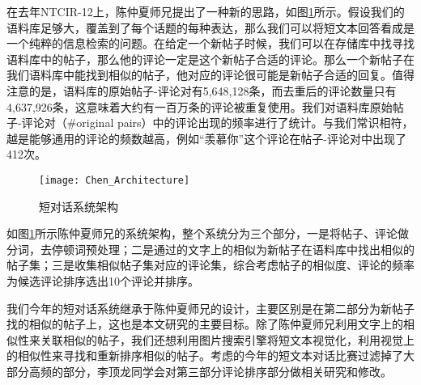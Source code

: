 在去年NTCIR-12上，陈仲夏师兄提出了一种新的思路，如图\ref{fig:Chen_Architecture}所示。假设我们的语料库足够大，覆盖到了每个话题的每种表达，那么我们可以将短文本回答看成是一个纯粹的信息检索的问题。在给定一个新帖子时候，我们可以在存储库中找寻找语料库中的帖子，那么他的评论一定是这个新帖子合适的评论。那么一个新帖子在我们语料库中能找到相似的帖子，他对应的评论很可能是新帖子合适的回复。值得注意的是，语料库的原始帖子-评论对有5,648,128条，而去重后的评论数量只有4,637,926条，这意味着大约有一百万条的评论被重复使用。我们对语料库原始帖子-评论对（\#original pairs）中的评论出现的频率进行了统计。与我们常识相符，越是能够通用的评论的频数越高，例如“羡慕你”这个评论在帖子-评论对中出现了412次。

\begin{figure}[ht]
\centering
\texttt{[image: Chen\_Architecture]}
\caption{短对话系统架构} \label{fig:Chen_Architecture}
\end{figure}

如图\ref{fig:Chen_Architecture}所示陈仲夏师兄的系统架构，整个系统分为三个部分，一是将帖子、评论做分词，去停顿词预处理；二是通过的文字上的相似为新帖子在语料库中找出相似的帖子集；三是收集相似帖子集对应的评论集，综合考虑帖子的相似度、评论的频率为候选评论排序选出10个评论并排序。

我们今年的短对话系统继承于陈仲夏师兄的设计，主要区别是在第二部分为新帖子找的相似的帖子上，这也是本文研究的主要目标。除了陈仲夏师兄利用文字上的相似性来关联相似的帖子，我们还想利用图片搜索引擎将短文本视觉化，利用视觉上的相似性来寻找和重新排序相似的帖子。考虑的今年的短文本对话比赛过滤掉了大部分高频的部分，李顶龙同学会对第三部分评论排序部分做相关研究和修改。






